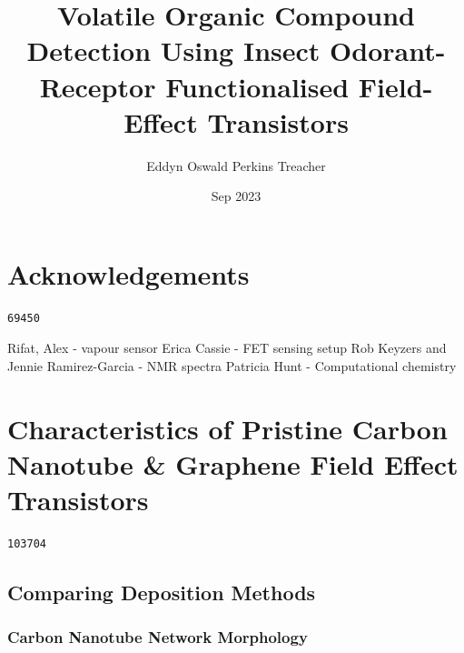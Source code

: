 \documentclass[
  a4paper,
]{scrbook}
\title{Volatile Organic Compound Detection Using Insect Odorant-Receptor
Functionalised Field-Effect Transistors}
\author{Eddyn Oswald Perkins Treacher}
\date{Sep 2023}
\begin{document}
\frontmatter
\maketitle
\ifdefined\Shaded\renewenvironment{Shaded}{\begin{tcolorbox}[frame hidden, sharp corners, borderline west={3pt}{0pt}{shadecolor}, breakable, boxrule=0pt, interior hidden, enhanced]}{\end{tcolorbox}}\fi

\mainmatter
{}

\hypertarget{acknowledgements}{%
\chapter*{Acknowledgements}\label{acknowledgements}}


\begin{verbatim}
69450
\end{verbatim}

Rifat, Alex - vapour sensor Erica Cassie - FET sensing setup Rob Keyzers
and Jennie Ramirez-Garcia - NMR spectra Patricia Hunt - Computational
chemistry


\hypertarget{characteristics-of-pristine-carbon-nanotube-graphene-field-effect-transistors}{%
\chapter{Characteristics of Pristine Carbon Nanotube \& Graphene Field
Effect
Transistors}\label{characteristics-of-pristine-carbon-nanotube-graphene-field-effect-transistors}}

\begin{verbatim}
103704
\end{verbatim}

\hypertarget{comparing-deposition-methods}{%
\section{Comparing Deposition
Methods}\label{comparing-deposition-methods}}

\hypertarget{carbon-nanotube-network-morphology}{%
\subsection{Carbon Nanotube Network
Morphology}\label{carbon-nanotube-network-morphology}}
\end{document}
